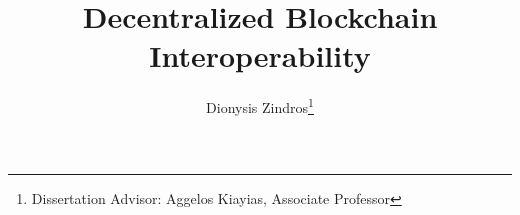 \title{
        Decentralized Blockchain Interoperability
}
\author{
        Dionysis Zindros\thanks{Dissertation Advisor: Aggelos Kiayias, Associate Professor}
}
\maketitle
\noindent
